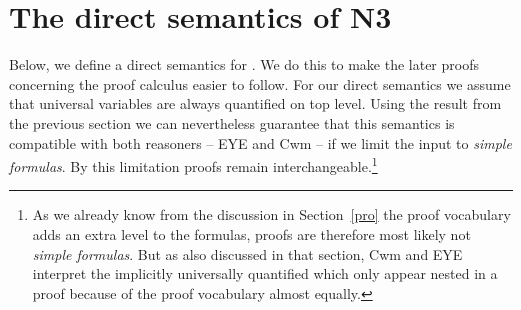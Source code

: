 % 


\section{The direct semantics of N3}
\label{nthree}
% 
Below, we define a direct semantics for \nthree. We do this to make the later proofs concerning the proof calculus easier to follow. For our direct semantics we assume that universal variables are
always quantified on top level. Using the result from the previous section we can nevertheless guarantee that this semantics is compatible with both reasoners -- EYE and Cwm -- 
if we limit the input to \emph{simple formulas}. By this limitation proofs remain interchangeable.\footnote{As we already know from the discussion in Section~\ref{pro} the proof 
vocabulary adds an extra level to the formulas, proofs are therefore most likely not \emph{simple formulas}. But as also discussed in that section, %
Cwm and EYE interpret the implicitly universally quantified which only appear nested in a proof because of the proof vocabulary almost equally.
}


